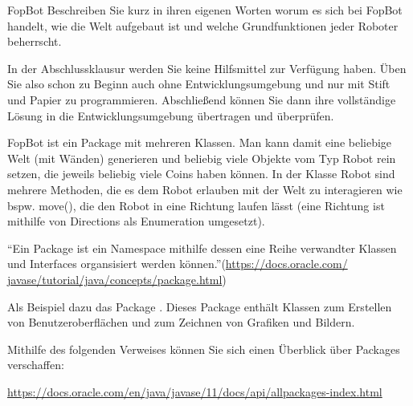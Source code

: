 \documentclass{../tuda-exercise}
\begin{document}
  \maketitle

  \begin{task}[credit=\stars{0}{3}]{FopBot}
    Beschreiben Sie kurz in ihren eigenen Worten worum es sich bei FopBot handelt, wie die Welt
    aufgebaut ist und
    welche Grundfunktionen jeder Roboter beherrscht.

    \begin{note}[
      title=Für alle Aufgaben auf diesem und allen weiteren Übungsblättern:,
      color=tuda-red
    ]
      In der Abschlussklausur werden Sie keine Hilfsmittel zur Verfügung haben. Üben Sie also
      schon zu Beginn auch ohne Entwicklungsumgebung und nur mit Stift und Papier zu
      programmieren. Abschließend können Sie dann ihre vollständige Lösung in die
      Entwicklungsumgebung übertragen und überprüfen.
    \end{note}

    \begin{solution}
      FopBot ist ein Package mit mehreren Klassen. Man kann damit eine beliebige Welt (mit
      Wänden) generieren und beliebig viele Objekte vom Typ Robot rein setzen, die jeweils
      beliebig viele Coins haben können. In der Klasse Robot sind mehrere Methoden, die es dem
      Robot erlauben mit der Welt zu interagieren wie bspw. move(), die den Robot in eine
      Richtung laufen lässt (eine Richtung ist mithilfe von Directions als Enumeration umgesetzt).

      \begin{note}[title=Information:]
        \enquote{Ein Package ist ein Namespace mithilfe dessen eine Reihe verwandter Klassen und
        Interfaces organsisiert werden können.}(\url{https://docs.oracle.com/
        javase/tutorial/java/concepts/package.html})

        \br

        Als Beispiel dazu das Package . Dieses Package enthält Klassen zum
        Erstellen von Benutzeroberflächen und zum Zeichnen von Grafiken und Bildern.

        \br

        Mithilfe des folgenden Verweises können Sie sich einen Überblick über Packages verschaffen:

        \begin{center}
          \url{https://docs.oracle.com/en/java/javase/11/docs/api/allpackages-index.html}
        \end{center}


\end{note}
\end{solution}
\end{task}
\end{document}
